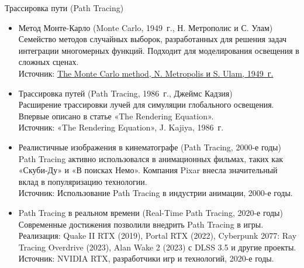 \documentclass{beamer}
\begin{document}
	\begin{frame}{Трассировка пути (Path Tracing)}

		\footnotesize

		\begin{itemize}

			\item 
			Метод Монте-Карло (Monte Carlo, 1949~г., Н. Метрополис и С. Улам)\\
			Семейство методов случайных выборок, разработанных для решения задач интеграции многомерных функций. Подходит для моделирования освещения в сложных сценах.\\
			{Источник:} \href{https://web.williams.edu/Mathematics/sjmiller/public_html/105Sp10/handouts/MetropolisUlam_TheMonteCarloMethod.pdf}{The Monte Carlo method, N. Metropolis и S. Ulam, 1949~г.}
			
			\item 
			Трассировка путей (Path Tracing, 1986~г., Джеймс Кадзия)\\
			Расширение трассировки лучей для симуляции глобального освещения. Впервые описано в статье «The Rendering Equation».\\
			{Источник:} «The Rendering Equation», J. Kajiya, 1986~г.
						
			\item 
			Реалистичные изображения в кинематографе (Path Tracing, 2000-е годы)\\
			Path Tracing активно использовался в анимационных фильмах, таких как «Скуби-Ду» и «В поисках Немо». Компания Pixar внесла значительный вклад в популяризацию технологии.\\
			{Источник:} Использование Path Tracing в индустрии анимации, 2000-е годы.
			
			\item 
			Path Tracing в реальном времени (Real-Time Path Tracing, 2020-е годы)\\
			Современные достижения позволили внедрить Path Tracing в игры. Реализация: Quake II RTX (2019), Portal RTX (2022), Cyberpunk 2077: Ray Tracing Overdrive (2023), Alan Wake 2 (2023) с DLSS 3.5 и другие проекты.\\
			{Источник:} NVIDIA RTX, разработчики игр и технологий, 2020-е годы.

		\end{itemize}

		\note{
			\footnotesize

}
\end{frame}
\end{document}
